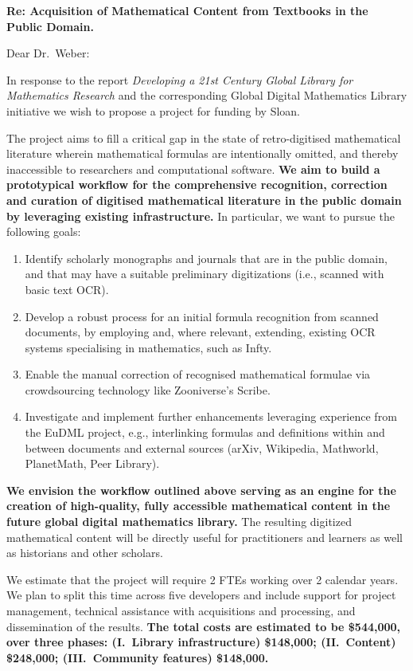 \documentclass[10pt]{article}
\begin{document}
\thispagestyle{empty}

\noindent\textbf{Re: \quad Acquisition of Mathematical Content from Textbooks in the Public Domain.}

\bigskip

\noindent Dear Dr.~Weber:

\bigskip

In response to the report \emph{Developing a 21st Century Global Library
for Mathematics Research} and the corresponding Global Digital
Mathematics Library initiative we wish to propose a project 
for funding by Sloan.

The project aims to fill a critical gap
in the state of retro-digitised mathematical literature
wherein mathematical formulas are intentionally omitted, 
and thereby inaccessible to researchers and computational software.
\textbf{We aim to build a prototypical workflow for the comprehensive 
recognition, correction
and curation of digitised mathematical literature in the public domain 
by leveraging existing infrastructure.} In particular, we want to pursue 
the following goals:
\begin{enumerate}
\item Identify scholarly monographs and journals that are in the
  public domain, and that may have a suitable preliminary
  digitizations (i.e., scanned with basic text OCR).
\item Develop a robust process for an initial formula recognition from scanned 
documents, by employing and, where relevant, extending, existing OCR systems 
specialising in mathematics, such as {\sf Infty}.
\item Enable 
the manual correction of recognised mathematical formulae via crowdsourcing 
technology like Zooniverse's {\sf Scribe}.
\item Investigate and implement further enhancements leveraging
experience from the EuDML project, e.g., 
interlinking formulas and definitions within and between documents and
external sources  (arXiv, Wikipedia, Mathworld, PlanetMath, Peer 
Library).
\end{enumerate}
\textbf{We envision the workflow outlined above serving as an engine
  for the creation of high-quality, fully accessible mathematical
  content in the future global digital mathematics library.}  The
resulting digitized mathematical content will be directly useful for
practitioners and learners as well as historians and other scholars.

We estimate that the project will require 2 FTEs working
over 2 calendar years.  We plan to split this time across
five developers and include support for project management, technical
assistance with acquisitions and processing, and dissemination of the
results.  \textbf{The total costs are estimated to be \$544,000, over
  three phases: (I.~Library infrastructure) \$148,000; (II.~Content)
  \$248,000; (III.~Community features) \$148,000.}
\end{document}
